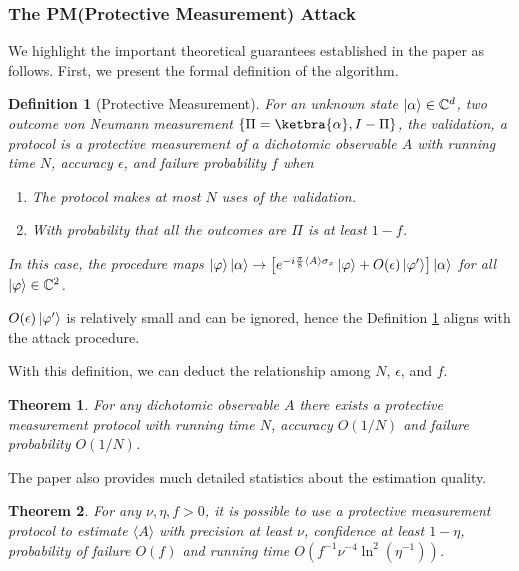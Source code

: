 \documentclass{article} %
\newtheorem{definition}{Definition}
\newtheorem{theorem}{Theorem}
\begin{document}
\subsubsection{The PM(Protective Measurement) Attack}
We highlight the important theoretical guarantees established in the paper as follows. First, we present the formal definition of the algorithm.

\begin{definition}[Protective Measurement]\label{def1}
For an unknown state $\ket{\alpha}\in \mathbb{C}^d$, two outcome von Neumann measurement $\{\Pi=\ketbra{\alpha} , I-\Pi\}$, the validation, a protocol is a  protective measurement of a dichotomic observable $A$  with running time $N$, accuracy $\epsilon$, and failure probability $f$ when 
\begin{enumerate}
    \item The protocol makes at most $N$ uses of the validation.
    \item With probability that all the outcomes are $\Pi$ is at least $1-f$.
\end{enumerate}
In this case, the procedure maps $\ket{\varphi}\ket{\alpha} \rightarrow \left[ e^{-i \frac{\pi}{8} \langle A \rangle\sigma_x} \ket{\varphi} + O(\epsilon)\ket{\varphi'}\right]\ket{\alpha}$ for all $\ket{\varphi}\in \mathbb{C}^2$. 
\end{definition}
$O(\epsilon)\ket{\varphi'}$ is relatively small and can be ignored, hence the Definition \ref{def1} aligns with the attack procedure.

With this definition, we can deduct the relationship among $N$, $\epsilon$, and $f$.

\begin{theorem}\label{theo1}
    For any dichotomic observable $A$ there exists a protective measurement protocol with running time $N$, accuracy $O(1/N)$ and failure probability $O(1/N)$. 
\end{theorem}

The paper also provides much detailed statistics about the estimation quality.

\begin{theorem}\label{theo2}
    For any $\nu , \eta, f > 0$, it is possible to use a protective measurement protocol  to estimate $\langle A \rangle$ with precision at least $\nu$, confidence at least $1-\eta$, probability of failure $O(f)$ and running time  $O\left(f^{-1}\nu^{-4}\ln^2(\eta^{-1})  \right)$.
\end{theorem}
\end{document}
